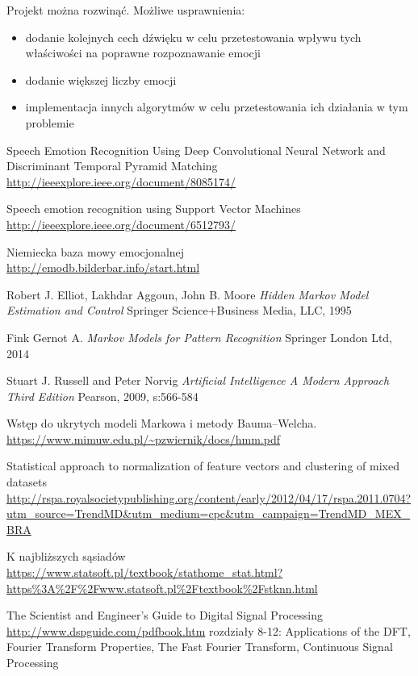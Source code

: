 \documentclass[declaration,shortabstract]{iithesis}
\begin{document}
Projekt można rozwinąć. Możliwe usprawnienia:
\begin{itemize}
\item dodanie kolejnych cech dźwięku w celu przetestowania wpływu tych właściwości na poprawne rozpoznawanie emocji
\item dodanie większej liczby emocji
\item implementacja innych algorytmów w celu przetestowania ich działania w tym problemie
\end{itemize}


\begin{thebibliography}{99}

Speech Emotion Recognition Using Deep Convolutional Neural Network and Discriminant Temporal Pyramid Matching
\\\url{http://ieeexplore.ieee.org/document/8085174/}

Speech emotion recognition using Support Vector Machines
\\\url{http://ieeexplore.ieee.org/document/6512793/}

Niemiecka baza mowy emocjonalnej
\\\url{http://emodb.bilderbar.info/start.html}

\bibitem{}
Robert J. Elliot, Lakhdar Aggoun, John B. Moore 
\textit{Hidden Markov Model Estimation and Control}
Springer Science+Business Media, LLC, 1995

\bibitem{}
Fink Gernot A.
\textit{Markov Models for Pattern Recognition}
Springer London Ltd, 2014

\bibitem{}
Stuart J. Russell and Peter Norvig
\textit{Artificial Intelligence A Modern Approach Third Edition}
Pearson, 2009, s:566-584

\bibitem{}
Wstęp do ukrytych modeli Markowa i metody Bauma–Welcha.
\\\url{https://www.mimuw.edu.pl/~pzwiernik/docs/hmm.pdf}

\bibitem{}
Statistical approach to normalization of feature vectors and clustering of mixed datasets
\\\url{http://rspa.royalsocietypublishing.org/content/early/2012/04/17/rspa.2011.0704?utm\_source=TrendMD\&utm\_medium=cpc\&utm\_campaign=TrendMD\_MEX\_BRA}

\bibitem{}
K najbliższych sąsiadów
\\\url{https://www.statsoft.pl/textbook/stathome\_stat.html?https\%3A\%2F\%2Fwww.statsoft.pl\%2Ftextbook\%2Fstknn.html}

\bibitem{}
The Scientist and Engineer's Guide to Digital Signal Processing
\\\url{http://www.dspguide.com/pdfbook.htm}
rozdziały 8-12: Applications of the DFT, Fourier Transform Properties, The Fast Fourier Transform, Continuous Signal Processing

\end{thebibliography}
\end{document}
